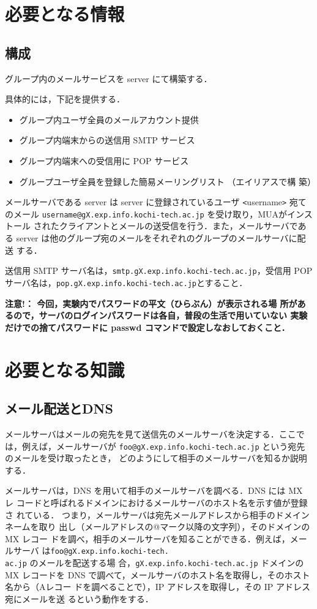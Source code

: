 \section{必要となる情報}
\subsection*{構成}
グループ内のメールサービスを server にて構築する．

具体的には，下記を提供する．

\begin{itemize}
 \item グループ内ユーザ全員のメールアカウント提供
 \item グループ内端末からの送信用 SMTP サービス
 \item グループ内端末への受信用に POP サービス
 \item グループユーザ全員を登録した簡易メーリングリスト （エイリアスで構
       築）
\end{itemize}

メールサーバである server は server に登録されているユーザ 
\verb+<+username\verb+>+ 宛てのメール
\texttt{username@gX.exp.info.kochi-tech.ac.jp} を受け取り，MUAがインストール
されたクライアントとメールの送受信を行う．また，メールサーバである 
server は他のグループ宛のメールをそれぞれのグループのメールサーバに配送
する．

送信用 SMTP サーバ名は，\texttt{smtp.gX.exp.info.kochi-tech.ac.jp}，受信用 
POP サーバ名は，\texttt{pop.gX.exp.info.kochi-tech.ac.jp}とすること．

\textbf{注意!： 今回，実験内でパスワードの平文（ひらぶん）が表示される場
所があるので，サーバのログインパスワードは各自，普段の生活で用いていない
実験だけでの捨てパスワードに passwd コマンドで設定しなおしておくこと．}

\section{必要となる知識}

\subsection*{メール配送とDNS}
メールサーバはメールの宛先を見て送信先のメールサーバを決定する．ここで
は，例えば，メールサーバが \texttt{foo@gX.exp.info.kochi-tech.ac.jp} 
という宛先のメールを受け取ったとき，
どのようにして相手のメールサーバを知るか説明する．

メールサーバは，DNS を用いて相手のメールサーバを調べる．DNS には MX レ
コードと呼ばれるドメインにおけるメールサーバのホスト名を示す値が登録さ
れている．
つまり，メールサーバは宛先メールアドレスから相手のドメインネームを取り
出し（メールアドレスの@マーク以降の文字列），そのドメインの MX レコー
ドを調べ，相手のメールサーバを知ることができる．例えば，メールサーバ
は\texttt{foo@gX.exp.info.kochi-tech.\\ac.jp} のメールを配送する場
合，\texttt{gX.exp.info.kochi-tech.ac.jp} ドメインの MX レコードを
DNS で調べて，メールサーバのホスト名を取得し，そのホスト名から（Aレコー
ドを調べることで），IP アドレスを取得し，その IP アドレス宛にメールを送
るという動作をする．

